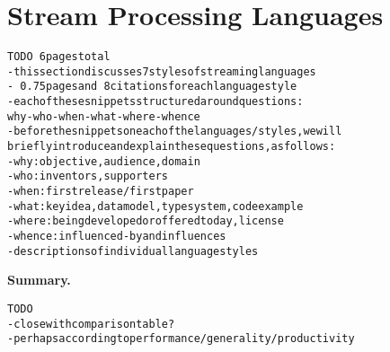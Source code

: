 \section{Stream Processing Languages}\label{sec:languages}

\begin{alltt}TODO\scriptsize ~6 pages total
- this section discusses 7 styles of streaming languages
  - ~0.75 pages and ~8 citations for each language style
  - each of these snippets structured around questions:
    why-who-when-what-where-whence
- before the snippets on each of the languages/styles, we will
  briefly introduce and explain these questions, as follows:
  - why: objective, audience, domain
  - who: inventors, supporters
  - when: first release / first paper
  - what: key idea, data model, type system, code example
  - where: being developed or offered today, license
  - whence: influenced-by and influences
- descriptions of individual language styles
\end{alltt}









\textbf{Summary.}
\begin{alltt}TODO\scriptsize
- close with comparison table?
- perhaps according to performance/generality/productivity
\end{alltt}
